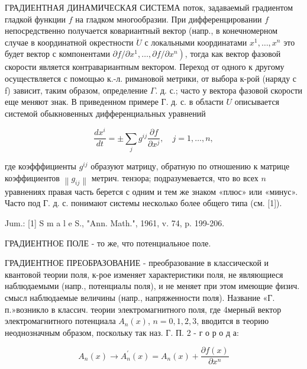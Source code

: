 \documentclass[10pt]{article}
\begin{document}
ГРАДИЕНТНАЯ ДИНАМИЧЕСКАЯ СИСТЕМА поток, задаваемый градиентом гладкой функции $f$ на гладком многообразии. При дифференцировании $f$ непосредственно получается ковариантный вектор (напр., в конечномерном случае в координатной окрестности $\ddot{U}$ с локальными координатами $x^{1}, \ldots, x^{n}$ это будет вектор с компонентами $\left.\partial f / \partial x^{1}, \ldots, \partial f / \partial x^{n}\right)$, тогда как вектор фазовой скорости является контравариантным вектором. Переход от одного к другому осуществляется с помощью к.-л. римановой метрики, от выбора к-рой (наряду с f) зависит, таким образом, определение $\Gamma$. д. с.; часто у вектора фазовой скорости еще меняют знак. В приведенном примере Г. д. с. в области $U$ описывается системой обыкновенных дифференциальных уравнений



\[

\frac{d x^{i}}{d t}= \pm \sum_{j} g^{i j} \frac{\partial f}{\partial x^{j}}, \quad j=1, \ldots, n,

\]



где коэфффициенты $g^{i j}$ образуют матрицу, обратную по отношению к матрице коэффициентов $\left\|g_{i j}\right\|$ метрич. тензора; подразумевается, что во всех $n$ уравнениях правая часть берется с одним и тем же знаком «плюс» или «минус». Часто под $Г$. д. с. понимают системы несколько более общего типа (см. [1]).



Jum.: [1] S m a l e S., "Ann. Math.", 1961, v. 74, p. 199-206.



ГРАДИЕНТНОЕ ПОЛЕ - то же, что потенциальное поле.



ГРАДИЕНТНОЕ ПРЕОБРАЗОВАНИЕ - преобразование в классической и квантовой теории поля, к-рое изменяет характеристики поля, не являющиеся наблюдаемыми (напр., потенциалы поля), и не меняет при этом имеющие физич. смысл наблюдаемые величины (напр., напряженности поля). Название «Г. п.»возникло в классич. теории электромагнитного поля, где 4мерный вектор электромагнитного потенциала $A_{n}(x)$, $n=0,1,2,3$, вводится в теорию неоднозначным образом, поскольку так наз. Г. П. 2 - г о р о д а:



\[

A_{n}(x) \longrightarrow A_{n}^{\prime}(x)=A_{n}(x)+\frac{\partial f(x)}{\partial x^{n}}

\]
\end{document}
